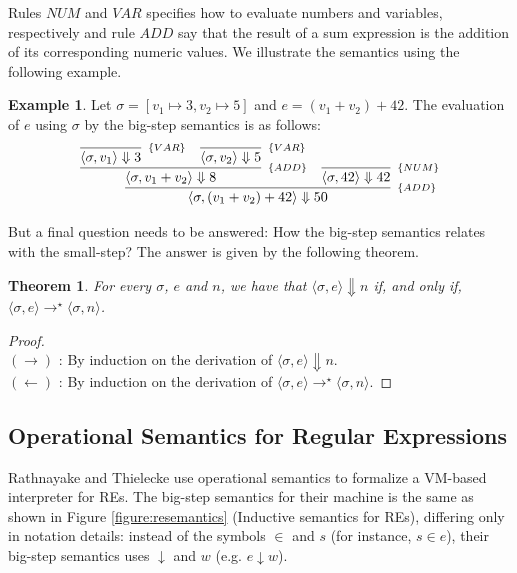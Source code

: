 \documentclass[oneside,12pt]{scrbook}
\newtheorem{Theorem}{Theorem}
\theoremstyle{definition}
\newtheorem{Example}{Example}
\theoremstyle{plain}
\theoremstyle{definition}
\begin{document}
Rules $NUM$ and $VAR$ specifies how to evaluate numbers and variables, respectively and rule
$ADD$ say that the result of a sum expression is the addition of its corresponding numeric values.
We illustrate the semantics using the following example.

\begin{Example}
   Let $\sigma = [v_1\mapsto 3, v_2\mapsto 5]$ and $e = (v_1 + v_2) + 42$. The evaluation of $e$ using $\sigma$
   by the big-step semantics is as follows:
   \[
      \infer[_{\{ADD\}}]
            {\langle \sigma, (v_1 + v_2) + 42 \rangle \Downarrow 50}
            {
              \infer[_{\{ADD\}}]
                    {\langle \sigma, v_1 + v_2 \rangle \Downarrow 8}
                    {
                       \infer[_{\{VAR\}}]
                             {\langle \sigma, v_1 \rangle \Downarrow 3}{} &
                       \infer[_{\{VAR\}}]
                             {\langle \sigma, v_2 \rangle \Downarrow 5}{}
                    }
              &
              \infer[_{\{NUM\}}]
                    {\langle \sigma, 42 \rangle \Downarrow 42}{}
            }
   \]
\end{Example}

But a final question needs to be answered: How the big-step semantics relates with the small-step?
The answer is given by the following theorem.

\begin{Theorem}
   For every $\sigma$, $e$ and $n$, we have that $\langle \sigma, e \rangle \Downarrow n$ if, and only if,
   $\langle \sigma, e \rangle \to^\star \langle \sigma, n \rangle$.
\end{Theorem}
\begin{proof} $\:$\\
   $(\to)$ : By induction on the derivation of $\langle \sigma, e \rangle \Downarrow n$. \\
   $(\leftarrow)$ : By induction on the derivation of $\langle \sigma, e \rangle \to^\star \langle \sigma, n \rangle$.
\end{proof}

\subsection{Operational Semantics for Regular Expressions}\label{subsection:reoperationalsemantics}

Rathnayake and Thielecke \cite{Rathnayake2011} use operational semantics to formalize a VM-based interpreter for REs. The big-step semantics for their machine is the same as shown in Figure \ref{figure:resemantics} (Inductive semantics for REs), differing only in notation details: instead of the symbols $\in$ and $s$ (for instance, $s \in e$), their big-step semantics uses $\downarrow$ and $w$ (e.g. $e \downarrow w$).
\end{document}
